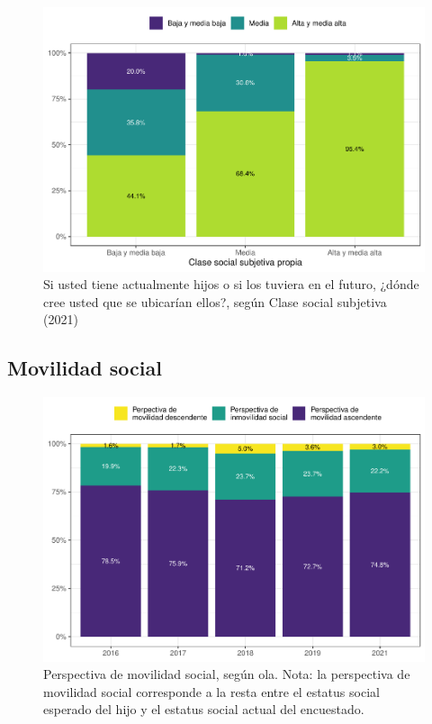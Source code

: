\documentclass[
  12pt,
]{book}
\begin{document}
\begin{figure}

{\centering \includegraphics{reporte-elsoc_files/figure-latex/esshijos-ess-1} 

}

\caption{Si usted tiene actualmente hijos o si los tuviera en el futuro, ¿dónde cree usted que se ubicarían ellos?, según Clase social subjetiva (2021)}\label{fig:esshijos-ess}
\end{figure}

\hypertarget{movilidad-social}{%
\subsection{Movilidad social}\label{movilidad-social}}

\begin{figure}

{\centering \includegraphics{reporte-elsoc_files/figure-latex/mov-soc-rec-1} 

}

\caption{Perspectiva de movilidad social, según ola.
Nota: la perspectiva de movilidad social corresponde a la resta entre el estatus social esperado del hijo y el estatus social actual del encuestado.}\label{fig:mov-soc-rec}
\end{figure}
\end{document}
